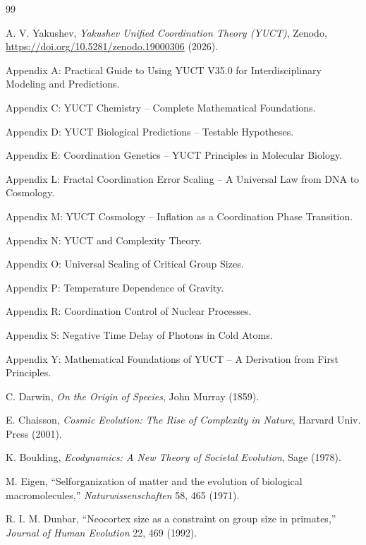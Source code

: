 \documentclass[12pt,a4paper]{article}
\theoremstyle{remark}
\begin{document}
	\begin{thebibliography}{99}
		
		A. V. Yakushev, \emph{Yakushev Unified Coordination Theory (YUCT)}, Zenodo, \url{https://doi.org/10.5281/zenodo.19000306} (2026).
		
		Appendix A: Practical Guide to Using YUCT V35.0 for Interdisciplinary Modeling and Predictions.
		
		Appendix C: YUCT Chemistry -- Complete Mathematical Foundations.
		
		Appendix D: YUCT Biological Predictions -- Testable Hypotheses.
		
		Appendix E: Coordination Genetics -- YUCT Principles in Molecular Biology.
		
		Appendix L: Fractal Coordination Error Scaling -- A Universal Law from DNA to Cosmology.
		
		Appendix M: YUCT Cosmology -- Inflation as a Coordination Phase Transition.
		
		Appendix N: YUCT and Complexity Theory.
		
		Appendix O: Universal Scaling of Critical Group Sizes.
		
		Appendix P: Temperature Dependence of Gravity.
		
		Appendix R: Coordination Control of Nuclear Processes.
		
		Appendix S: Negative Time Delay of Photons in Cold Atoms.
		
		Appendix Y: Mathematical Foundations of YUCT -- A Derivation from First Principles.
		
		C. Darwin, \emph{On the Origin of Species}, John Murray (1859).
		
		E. Chaisson, \emph{Cosmic Evolution: The Rise of Complexity in Nature}, Harvard Univ. Press (2001).
		
		K. Boulding, \emph{Ecodynamics: A New Theory of Societal Evolution}, Sage (1978).
		
		M. Eigen, ``Selforganization of matter and the evolution of biological macromolecules,'' \emph{Naturwissenschaften} 58, 465 (1971).
		
		R. I. M. Dunbar, ``Neocortex size as a constraint on group size in primates,'' \emph{Journal of Human Evolution} 22, 469 (1992).
		

\end{thebibliography}
\end{document}
